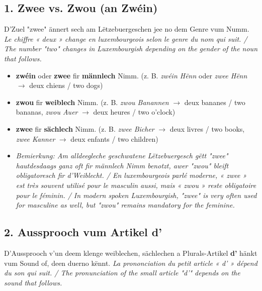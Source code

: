 \subsection*{1. Zwee vs. Zwou (an Zwéin)}
D'Zuel "zwee" ännert sech am Lëtzebuergeschen jee no dem Genre vum Numm. \textit{Le chiffre « deux » change en luxembourgeois selon le genre du nom qui suit. / The number "two" changes in Luxembourgish depending on the gender of the noun that follows.}

\begin{itemize}
    \item \textbf{zwéin} oder \textbf{zwee} fir \textbf{männlech} Nimm. (z. B. \textit{zwéin Hënn} oder \textit{zwee Hënn} $\rightarrow$ deux chiens / two dogs)
    \item \textbf{zwou} fir \textbf{weiblech} Nimm. (z. B. \textit{zwou Banannen} $\rightarrow$ deux bananes / two bananas, \textit{zwou Auer} $\rightarrow$ deux heures / two o'clock)
    \item \textbf{zwee} fir \textbf{sächlech} Nimm. (z. B. \textit{zwee Bicher} $\rightarrow$ deux livres / two books, \textit{zwee Kanner} $\rightarrow$ deux enfants / two children)
    \item \textit{Bemierkung: Am alldeegleche geschwatene Lëtzebuergesch gëtt "zwee" hautdesdaags ganz oft fir männlech Nimm benotzt, awer "zwou" bleift obligatoresch fir d'Weiblecht. / En luxembourgeois parlé moderne, « zwee » est très souvent utilisé pour le masculin aussi, mais « zwou » reste obligatoire pour le féminin. / In modern spoken Luxembourgish, "zwee" is very often used for masculine as well, but "zwou" remains mandatory for the feminine.}
\end{itemize}

\subsection*{2. Aussprooch vum Artikel d'}
D'Aussprooch v'un deem klenge weiblechen, sächlechen a Plurals-Artikel \textbf{d'} hänkt vum Sound of, deen duerno kënnt. \textit{La prononciation du petit article « d' » dépend du son qui suit. / The pronunciation of the small article "d'" depends on the sound that follows.}

